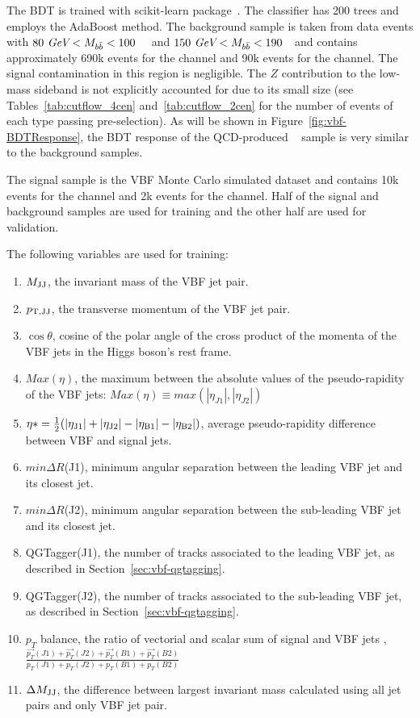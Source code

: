 \label{sec:vbf-bdt}
The BDT is trained with scikit-learn package~\cite{scikit-learn}.
The classifier has 200 trees and employs the AdaBoost method.
The background sample is taken from data events with $80~\textit{GeV} < M_{b\bar{b}} <100$~\GeV~
and $150~\textit{GeV}<M_{b\bar{b}}<190$~\GeV~and contains approximately 690k events for
the \fourcentral channel and 90k events for the \twocentral channel.
The signal contamination in this region is negligible.
The $Z$ contribution to the low-mass sideband is not explicitly accounted
for due to its small size (see Tables~\ref{tab:cutflow_4cen}
and~\ref{tab:cutflow_2cen} for the number of events of each type passing pre-selection).
As will be shown in Figure~\ref{fig:vbf-BDTResponse},
the BDT response of the QCD-produced \zjets~ sample is very similar to the background samples. 

The signal sample is the VBF Monte Carlo simulated dataset and
contains 10k events for the \fourcentral channel and 2k events for
the \twocentral channel.  Half of the signal and background samples are
used for training and the other half are used for validation.

The following variables are used for training:
\begin{enumerate}
\item $M_{\rm JJ}$, the invariant mass of the VBF jet pair. 
\item $p_{\rm T,JJ}$, the transverse momentum of the VBF jet pair. 
\item $\cos{\theta}$, cosine of the polar angle of the cross product of the momenta of the VBF jets in the Higgs boson's rest frame.
\item $Max (\eta)$, the maximum between the absolute values of the pseudo-rapidity of the VBF jets: $Max (\eta) \equiv max( |\eta_{J1}|, |\eta_{J2}| )$
\item $\eta* = \frac{1}{2}( |\eta_{\rm J1}| + |\eta_{\rm J2}| - |\eta_{\rm B1}| - |\eta_{\rm B2}|)$, average pseudo-rapidity difference between VBF and signal jets.
\item $min\Delta R$(J1), minimum angular separation between the leading VBF jet and its closest jet. 
\item $min\Delta R$(J2), minimum angular separation between the sub-leading VBF jet and its closest jet. 
\item QGTagger(J1),  the number of tracks associated to the leading VBF jet, as described in Section~\ref{sec:vbf-qgtagging}.
\item QGTagger(J2),  the number of tracks associated to the sub-leading VBF jet, as described in Section~\ref{sec:vbf-qgtagging}.
\item $p_{T}$ balance, the ratio of vectorial and scalar sum of signal and VBF jets \pT,  $\frac{\overrightarrow{p_{T}}(J1)+\overrightarrow{p_{T}}(J2)+\overrightarrow{p_{T}}(B1)+\overrightarrow{p_{T}}(B2) }{ p_{T}(J1)+p_{T}(J2)+p_{T}(B1)+p_{T}(B2)}$
\item $\Delta M_{\rm JJ}$, the difference between largest invariant mass calculated using all jet pairs and only VBF jet pair. 
\end{enumerate}

